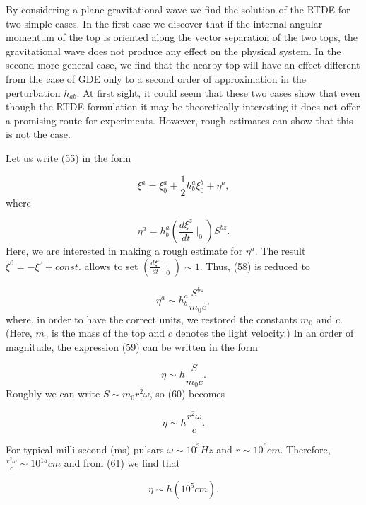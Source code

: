 \documentclass[a4paper,12pt]{article}
\begin{document}
By considering a plane gravitational wave we find the solution of the RTDE
for two simple cases. In the first case we discover that if the internal
angular momentum of the top is oriented along the vector separation of the
two tops, the gravitational wave does not produce any effect on the physical
system. In the second more general case, we find that the nearby top will
have an effect different from the case of GDE only to a second order of
approximation in the perturbation $h_{ab}$. At first sight, it could seem
that these two cases show that even though the RTDE formulation it may be
theoretically interesting it does not offer a promising route for
experiments. However, rough estimates can show that this is not the case.

Let us write (55) in the form

\begin{equation}
\xi ^{a}=\xi _{0}^{a}+\frac{1}{2}h_{b}^{a}\xi _{0}^{b}+\eta ^{a},  \label{57}
\end{equation}
where

\begin{equation}
\eta ^{a}=h_{b}^{a}(\frac{d\xi ^{z}}{dt}\mid _{0})S^{bz}.  \label{58}
\end{equation}
Here, we are interested in making a rough estimate for $\eta ^{a}$. The
result $\xi ^{0}=-\xi ^{z}+const.$ allows to set $(\frac{d\xi ^{z}}{dt}\mid
_{0})\sim 1.$ Thus, (58) is reduced to

\begin{equation}
\eta ^{a}\sim h_{b}^{a}\frac{S^{bz}}{m_{0}c},  \label{59}
\end{equation}
where, in order to have the correct units, we restored the constants $m_{0}$
and $c.$ (Here, $m_{0}$ is the mass of the top and $c$ denotes the light
velocity.) In an order of magnitude, the expression (59) can be written in
the form

\begin{equation}
\eta \sim h\frac{S}{m_{0}c}.  \label{60}
\end{equation}
Roughly we can write $S\sim m_{0}r^{2}\omega $, so (60) becomes

\begin{equation}
\eta \sim h\frac{r^{2}\omega }{c}.  \label{61}
\end{equation}

For typical milli second (ms) pulsars $\omega \sim 10^{3}Hz$ and $r\sim
10^{6}cm$. Therefore, $\frac{r^{2}\omega }{c}\sim 10^{15}cm$ and from (61)
we find that

\begin{equation}
\eta \sim h(10^{5}cm).  \label{62}
\end{equation}
\end{document}
